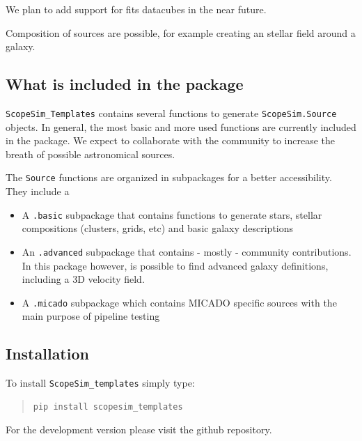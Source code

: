 We plan to add support for fits datacubes in the near future.

Composition of sources are possible, for example creating an stellar field around a galaxy.


\subsection{What is included in the package%
  \label{what-is-included-in-the-package}%
}

\texttt{ScopeSim\_Templates} contains several functions to generate \texttt{ScopeSim.Source} objects.
In general, the most basic and more used functions are currently included in the package.
We expect to collaborate with the community to increase the breath of possible astronomical
sources.

The \texttt{Source} functions are organized in subpackages for a better accessibility.
They include a

\begin{itemize}
\item A \texttt{.basic} subpackage that contains functions to generate stars, stellar compositions
(clusters, grids, etc) and basic galaxy descriptions

\item An \texttt{.advanced} subpackage that contains - mostly - community contributions. In this package
however, is possible to find advanced galaxy definitions, including a 3D velocity field.

\item A \texttt{.micado} subpackage which contains MICADO specific sources with the main purpose of pipeline
testing
\end{itemize}


\subsection{Installation%
  \label{installation}%
}

To install \texttt{ScopeSim\_templates} simply type:

\begin{quote}
\begin{alltt}
\begin{lstlisting}[frame=single]
pip install scopesim_templates
\end{lstlisting}
\end{alltt}
\end{quote}

For the development version please visit the github repository.

